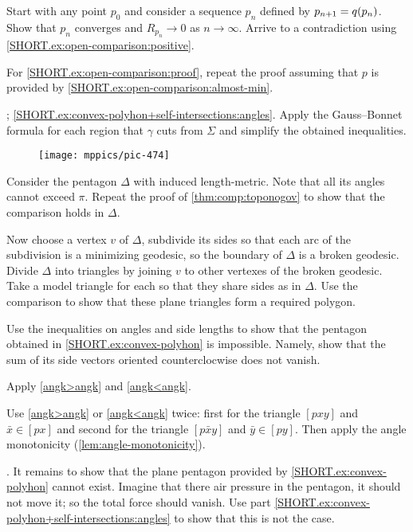 Start with any point $p_0$ and consider a sequence $p_n$ defined by $p_{n+1}\z=q(p_n)$.
Show that $p_n$ converges and $R_{p_n}\to 0$ as $n\to\infty$.
Arrive to a contradiction using  \ref{SHORT.ex:open-comparison:positive}.

For \ref{SHORT.ex:open-comparison:proof}, repeat the proof assuming that $p$ is provided by \ref{SHORT.ex:open-comparison:almost-min}.

\parbf{\ref{ex:convex-polyhon+self-intersections}}; \ref{SHORT.ex:convex-polyhon+self-intersections:angles}.
Apply the Gauss--Bonnet formula for each region that $\gamma$ cuts from $\Sigma$ and simplify the obtained inequalities.

\begin{wrapfigure}[9]{r}{50 mm}
\vskip-0mm
\centering
\texttt{[image: mppics/pic-474]}
\vskip8mm
\end{wrapfigure}

Consider the pentagon $\Delta$ with induced length-metric.
Note that all its angles cannot exceed $\pi$.
Repeat the proof of \ref{thm:comp:toponogov} to show that the comparison holds in $\Delta$.

Now choose a vertex $v$ of $\Delta$, subdivide its sides so that each arc of the subdivision is a minimizing geodesic, so the boundary of $\Delta$ is a broken geodesic.
Divide $\Delta$ into triangles by joining $v$ to other vertexes of the broken geodesic.
Take a model triangle for each so that they share sides as in $\Delta$.
Use the comparison to show that these plane triangles form a required polygon.

Use the inequalities on angles and side lengths to show that the pentagon obtained in \ref{SHORT.ex:convex-polyhon} is impossible.
Namely, show that the sum of its side vectors oriented counterclocwise does not vanish.  

 Apply \ref{angk>angk} and \ref{angk<angk}.

 Use \ref{angk>angk} or \ref{angk<angk} twice:
first for the triangle $[pxy]$ and $\bar x\in [px]$
and 
second for the triangle $[p\bar xy]$ and $\bar y\in [py]$.
Then apply the angle monotonicity (\ref{lem:angle-monotonicity}).

\parit{\ref{SHORT.ex:self-intersections-hard}}.
It remains to show that the plane pentagon provided by \ref{SHORT.ex:convex-polyhon} cannot exist.
Imagine that there air pressure in the pentagon, it should not move it; so the total force should vanish.
Use part \ref{SHORT.ex:convex-polyhon+self-intersections:angles} to show that this is not the case.


